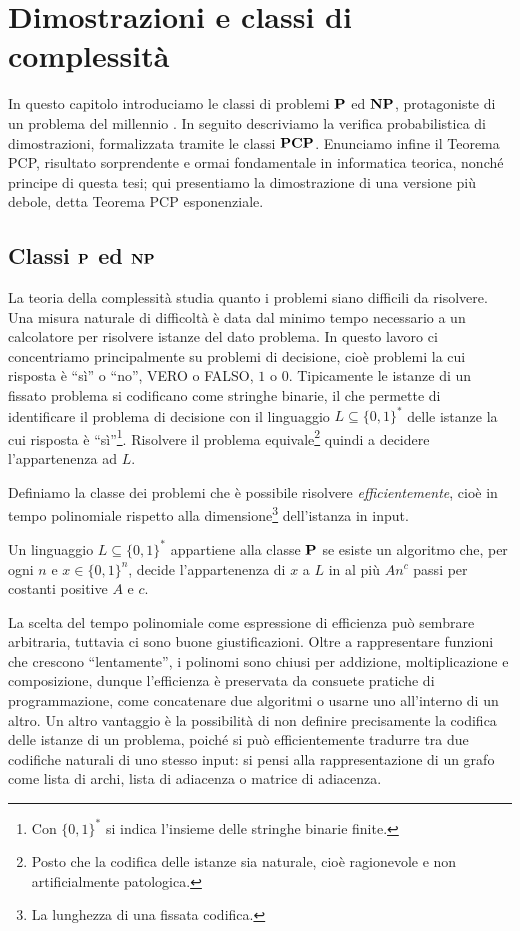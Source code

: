 \chapter{Dimostrazioni e classi di complessità} \label{chap:complessita}

In questo capitolo introduciamo le classi di problemi $\P$ ed $\mathbf{NP}$,
protagoniste di un problema del millennio \cite{Cook06}.
In seguito descriviamo la verifica probabilistica di dimostrazioni,
formalizzata tramite le classi $\mathbf{PCP}$.
Enunciamo infine il Teorema PCP, risultato sorprendente e ormai fondamentale in
informatica teorica, nonché principe di questa tesi; qui presentiamo la
dimostrazione di una versione più debole, detta Teorema PCP esponenziale.

\section{Classi \texorpdfstring{$\P$ ed $\mathbf{NP}$}{P ed NP}}

La teoria della complessità studia quanto i problemi siano difficili da
risolvere. Una misura naturale di difficoltà è data dal minimo tempo necessario
a un calcolatore
per risolvere istanze del dato problema. In questo lavoro ci concentriamo
principalmente su problemi di decisione, cioè problemi la cui risposta è
``sì'' o ``no'', VERO o FALSO, $1$ o $0$.
Tipicamente le istanze di un fissato problema si codificano come stringhe binarie,
il che permette di identificare il problema di decisione con il linguaggio
$L \subseteq \{0, 1\}^*$ delle istanze la cui risposta è ``sì''\footnote{Con
$\{0, 1\}^*$ si indica l'insieme delle stringhe binarie finite.}.
Risolvere il problema equivale\footnote{Posto che la codifica delle istanze sia
naturale, cioè ragionevole e non artificialmente patologica.} quindi a decidere
l'appartenenza ad $L$.

Definiamo la classe dei problemi che è possibile risolvere
\emph{efficientemente}, cioè in tempo polinomiale rispetto alla
dimensione\footnote{La lunghezza di una fissata codifica.} dell'istanza in
input.

\begin{definition}[Classe $\P$]
	Un linguaggio $L \subseteq \{0, 1\}^*$ appartiene alla classe $\P$ se esiste
	un algoritmo che, per ogni $n$ e $x \in \{0, 1\}^n$, decide l'appartenenza
	di $x$ a $L$ in al più $A n^c$ passi per costanti positive $A$ e $c$.
\end{definition}

La scelta del tempo polinomiale come espressione di efficienza può sembrare
arbitraria, tuttavia ci sono buone giustificazioni. Oltre a rappresentare
funzioni che crescono ``lentamente'', i polinomi sono chiusi per addizione,
moltiplicazione e composizione, dunque l'efficienza è preservata da consuete
pratiche di programmazione, come concatenare due algoritmi o usarne uno
all'interno di un altro. Un altro vantaggio è la possibilità di non
definire precisamente la codifica delle istanze di un problema, poiché
si può efficientemente tradurre tra due codifiche naturali di uno stesso
input: si pensi alla rappresentazione di un grafo come lista di archi, lista
di adiacenza o matrice di adiacenza.

